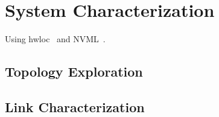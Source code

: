 \chapter{System Characterization}

Using hwloc~\cite{broquedis2010hwloc} and NVML~\cite{nvidia2017nvml}.

\section{Topology Exploration}

\section{Link Characterization}

